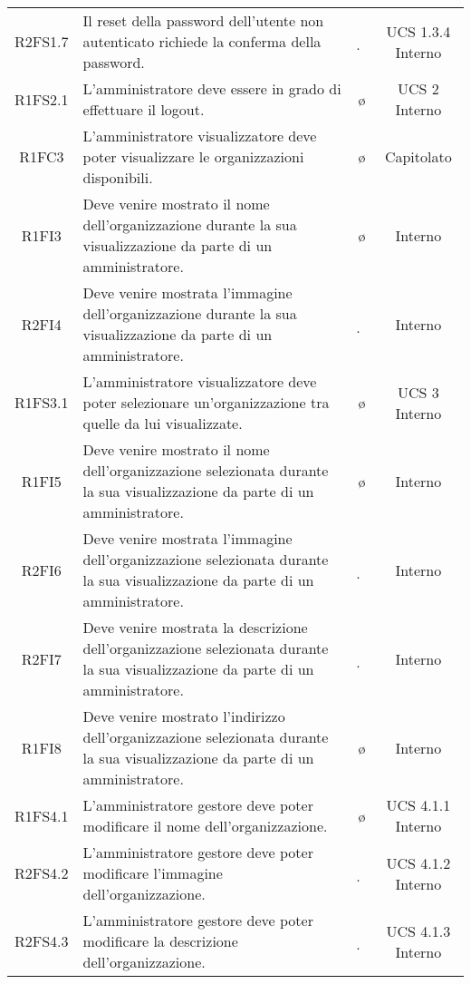 {\begin{longtable}{ c C{6.5cm} c c}
R2FS1.7 & Il reset della password dell'utente non autenticato richiede la conferma della password. & \d & UCS 1.3.4 Interno \\

R1FS2.1 & L'amministratore deve essere in grado di effettuare il logout. & \o & UCS 2 Interno\\

R1FC3 & L'amministratore visualizzatore deve poter visualizzare le organizzazioni disponibili. & \o & Capitolato\\

R1FI3 & Deve venire mostrato il nome dell'organizzazione durante la sua visualizzazione da parte di un amministratore. & \o & Interno\\

R2FI4 & Deve venire mostrata l'immagine dell'organizzazione durante la sua visualizzazione da parte di un amministratore. & \d & Interno\\

R1FS3.1 & L'amministratore visualizzatore deve poter selezionare un'organizzazione tra quelle da lui visualizzate. & \o & UCS 3 Interno\\

R1FI5 & Deve venire mostrato il nome dell'organizzazione selezionata durante la sua visualizzazione da parte di un amministratore. & \o & Interno\\

R2FI6 & Deve venire mostrata l'immagine dell'organizzazione selezionata durante la sua visualizzazione da parte di un amministratore. & \d & Interno\\

R2FI7 & Deve venire mostrata la descrizione dell'organizzazione selezionata durante la sua visualizzazione da parte di un amministratore. & \d & Interno\\

R1FI8 & Deve venire mostrato l'indirizzo dell'organizzazione selezionata durante la sua visualizzazione da parte di un amministratore. & \o & Interno\\


R1FS4.1 & L'amministratore gestore deve poter modificare il nome dell'organizzazione. & \o & UCS 4.1.1 Interno\\

R2FS4.2 & L'amministratore gestore deve poter modificare l'immagine dell'organizzazione. & \d & UCS 4.1.2 Interno\\

R2FS4.3 & L'amministratore gestore deve poter modificare la descrizione dell'organizzazione. & \d & UCS 4.1.3 Interno\\


\end{longtable}}
